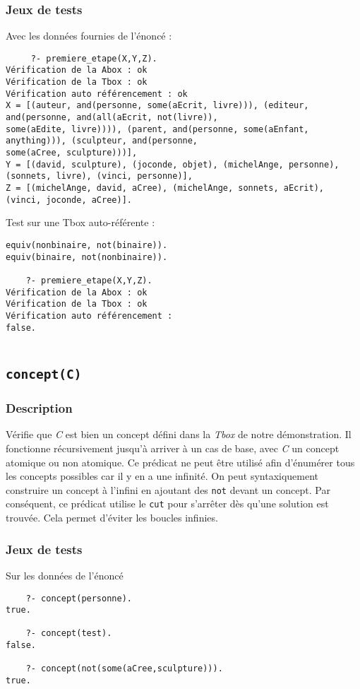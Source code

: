 \documentclass{article}
\newcommand{\code}[1]{\colorbox{light-gray}{\texttt{#1}}}
\begin{document}
\subsubsection{Jeux de tests}
Avec les données fournies de l'énoncé :
\begin{verbatim}
     ?- premiere_etape(X,Y,Z).
Vérification de la Abox : ok
Vérification de la Tbox : ok
Vérification auto référencement : ok
X = [(auteur, and(personne, some(aEcrit, livre))), (editeur, and(personne, and(all(aEcrit, not(livre)), 
some(aEdite, livre)))), (parent, and(personne, some(aEnfant, anything))), (sculpteur, and(personne, 
some(aCree, sculpture)))],
Y = [(david, sculpture), (joconde, objet), (michelAnge, personne), (sonnets, livre), (vinci, personne)],
Z = [(michelAnge, david, aCree), (michelAnge, sonnets, aEcrit), (vinci, joconde, aCree)].
\end{verbatim}

Test sur une Tbox auto-référente : 
\begin{verbatim}
equiv(nonbinaire, not(binaire)).
equiv(binaire, not(nonbinaire)).

    ?- premiere_etape(X,Y,Z).
Vérification de la Abox : ok
Vérification de la Tbox : ok
Vérification auto référencement :
false.
    
\end{verbatim}

\subsection{\code{concept(C)}}
\subsubsection{Description}

Vérifie que \textit{C} est bien un concept défini dans la \textit{Tbox} de notre démonstration. Il fonctionne récursivement jusqu'à arriver à un cas de base, avec \textit{C} un concept atomique ou non atomique. Ce prédicat ne peut être utilisé afin d'énumérer tous les concepts possibles car il y en a une infinité. On peut syntaxiquement construire un concept à l'infini en ajoutant des \code{not} devant un concept. Par conséquent, ce prédicat utilise le \code{cut} pour s'arrêter dès qu'une solution est trouvée. Cela permet d'éviter les boucles infinies.

\subsubsection{Jeux de tests}
Sur les données de l'énoncé
\begin{verbatim}
    ?- concept(personne).
true.

    ?- concept(test).
false.

    ?- concept(not(some(aCree,sculpture))).
true.
\end{verbatim}
\end{document}
